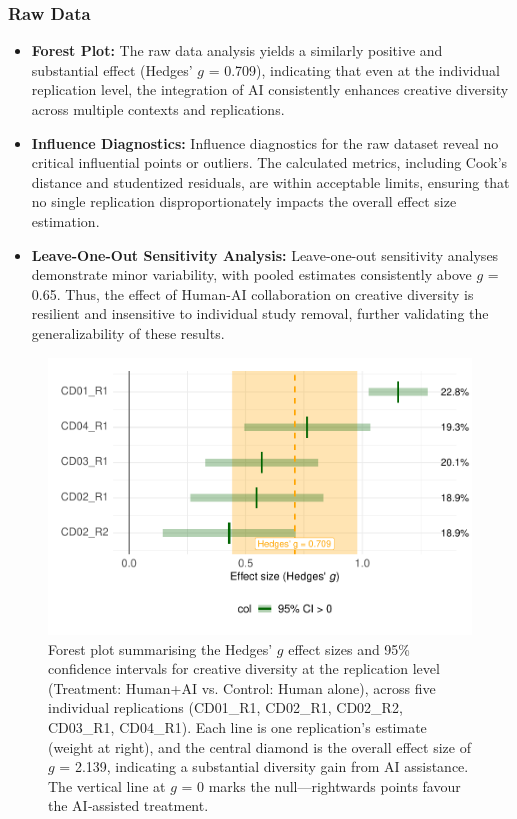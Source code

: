 \documentclass[manuscript, screen, review, acmsmall, anonymous]{acmart}
\begin{document}
\subsubsection{Raw Data}
\begin{itemize}
  \item \textbf{Forest Plot:} The raw data analysis yields a similarly positive and substantial effect (Hedges' $g$ = 0.709), indicating that even at the individual replication level, the integration of AI consistently enhances creative diversity across multiple contexts and replications.
  \item \textbf{Influence Diagnostics:} Influence diagnostics for the raw dataset reveal no critical influential points or outliers. The calculated metrics, including Cook’s distance and studentized residuals, are within acceptable limits, ensuring that no single replication disproportionately impacts the overall effect size estimation.
  \item \textbf{Leave-One-Out Sensitivity Analysis:} Leave-one-out sensitivity analyses demonstrate minor variability, with pooled estimates consistently above $g$ = 0.65. Thus, the effect of Human-AI collaboration on creative diversity is resilient and insensitive to individual study removal, further validating the generalizability of these results.
\end{itemize}
\begin{figure}[H]
  \centering
  \includegraphics[width=\linewidth]{plot_diversity_raw_forest}
  \caption{Forest plot summarising the Hedges’ $g$ effect sizes and 95\% confidence intervals for creative diversity at the replication level (Treatment: Human+AI vs. Control: Human alone), across five individual replications (CD01\_R1, CD02\_R1, CD02\_R2, CD03\_R1, CD04\_R1). Each line is one replication’s estimate (weight at right), and the central diamond is the overall effect size of $g$ = 2.139, indicating a substantial diversity gain from AI assistance. The vertical line at $g$ = 0 marks the null—rightwards points favour the AI‑assisted treatment.}
  \label{fig:diversity_raw_forest}
\end{figure}
\end{document}
